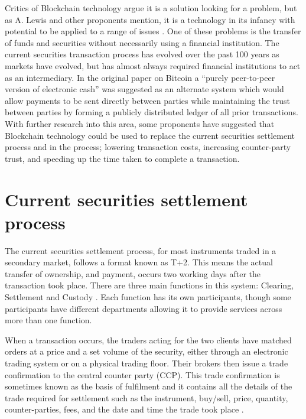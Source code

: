 \documentclass[pdftex]{article}
\begin{document}
Critics of Blockchain technology argue it is a solution looking for a problem, but as A. Lewis and other proponents mention, it is a technology in its infancy with potential to be applied to a range of issues \cite{SolnProb}. One of these problems is the transfer of funds and securities without necessarily using a financial institution. The current securities transaction process has evolved over the past 100 years as markets have evolved, but has almost always required financial institutions to act as an intermediary. In the original paper on Bitcoin a ``purely peer-to-peer version of electronic cash'' \cite{Bitcoin} was suggested as an alternate system which would allow payments to be sent directly between parties while maintaining the trust between parties by forming a publicly distributed ledger of all prior transactions.
With further research into this area, some proponents have suggested that Blockchain technology could be used to replace the current securities settlement process and in the process; lowering transaction costs, increasing counter-party trust, and speeding up the time taken to complete a transaction.

\section{Current securities settlement process}

The current securities settlement process, for most instruments traded in a secondary market, follows a format known as T+2. This means the actual transfer of ownership, and payment, occurs two working days after the transaction took place. There are three main functions in this system: Clearing, Settlement and Custody \cite{CCP}. Each function has its own participants, though some participants have different departments allowing it to provide services across more than one function.

When a transaction occurs, the traders acting for the two clients have matched orders at a price and a set volume of the security, either through an electronic trading system or on a physical trading floor. Their brokers then issue a trade confirmation to the central counter party (CCP). This trade confirmation is sometimes known as the basis of fulfilment and it contains all the details of the trade required for settlement such as the instrument, buy/sell, price, quantity, counter-parties, fees, and the date and time the trade took place \cite{CaytasCU}.
\end{document}
